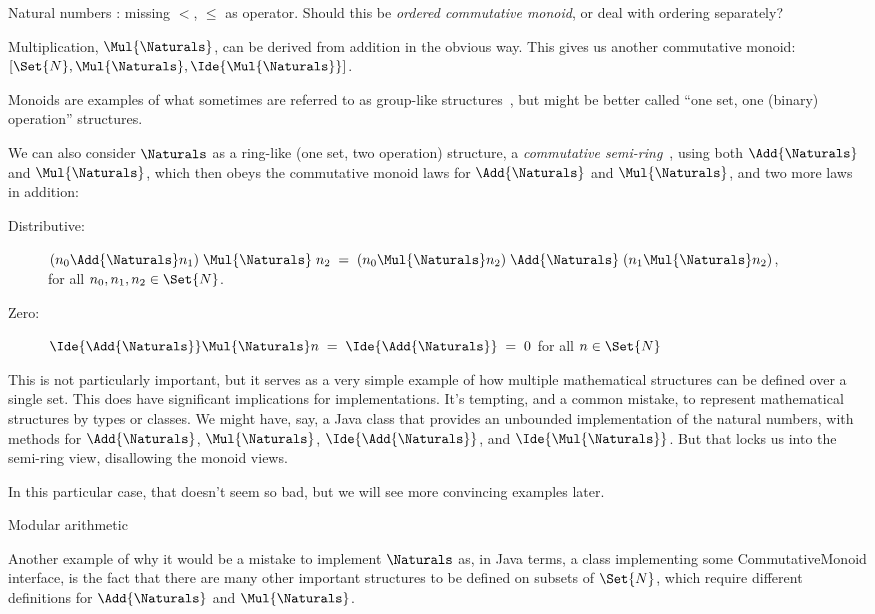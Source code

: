 \documentclass[12pt]{PalisadesLakesBook}
\begin{document}
\begin{plSection}{Natural numbers}
\TODO: missing $<$, $\leq$ as operator.
Should this be \emph{ordered commutative monoid},
or deal with ordering separately?

Multiplication, $\Mul{\Naturals}$, can be derived from addition in the
obvious way.
This gives us another commutative monoid:
$[\Set{N}, \Mul{\Naturals}, \Ide{\Mul{\Naturals}}]$.

Monoids are examples of what sometimes are referred to 
as group-like structures~\cite{wiki:GroupLike},
but might be better called ``one set, one (binary) operation''
structures.

We can also consider $\Naturals$ as a ring-like
(one set, two operation)
structure, a \emph{commutative semi-ring}~\cite{wiki:Semiring}, 
using both $\Add{\Naturals}$ and $\Mul{\Naturals}$,
which then obeys the commutative monoid laws for
$\Add{\Naturals}$ and $\Mul{\Naturals}$, and two more laws in addition:
\begin{description}
\item[Distributive:] 
$(n_0 \Add{\Naturals} n_1) \; \Mul{\Naturals}\; n_2 \;=\;
(n_0 \Mul{\Naturals} n_2) \; \Add{\Naturals} \; (n_1 \Mul{\Naturals} n_2)$, \\
for all $n_0, n_1, n_2 \in \Set{N}$.
\item[Zero:] $\Ide{\Add{\Naturals}} \Mul{\Naturals} n 
\; = \; \Ide{\Add{\Naturals}}
\; = \; 0$ for all $n \in \Set{N}$
\end{description}

This is not particularly important, but it serves as 
a very simple example
of how multiple mathematical structures can be defined
over a single set.
This does have significant implications for implementations.
It's tempting, and a common mistake, 
to represent mathematical structures by types or classes.
We might have, say, a Java class that provides an
unbounded implementation of the natural numbers,
with methods for $\Add{\Naturals}$, $\Mul{\Naturals}$, 
$\Ide{\Add{\Naturals}}$,
and $\Ide{\Mul{\Naturals}}$.
But that locks us into the semi-ring view,
disallowing the monoid views.

\TODO In this particular case, that doesn't seem so bad,
but we will see more convincing examples later.

\begin{plSection}{Modular arithmetic}

Another example of why it would be a mistake to implement
$\Naturals$ as, in Java terms,
a class implementing some {\javaFont CommutativeMonoid} interface,
is the fact that there are many other important structures
to be defined on subsets of $\Set{N}$, which require
different definitions for $\Add{\Naturals}$ and $\Mul{\Naturals}$.


\end{plSection}
\end{plSection}
\end{document}
